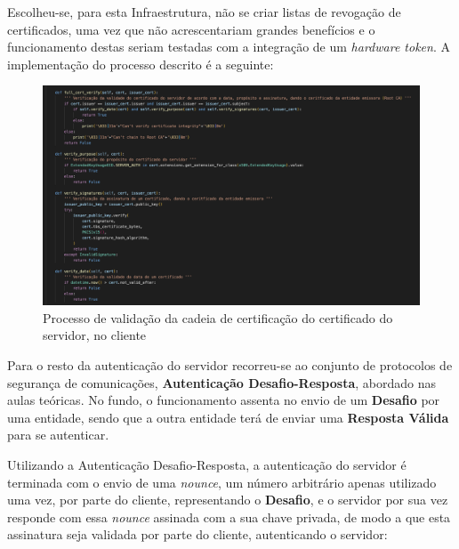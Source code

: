 \documentclass[10pt,english]{article}
\begin{document}
\par Escolheu-se, para esta Infraestrutura, não se criar listas de revogação de certificados, uma vez que não acrescentariam grandes benefícios e o funcionamento destas seriam testadas com a integração de um \textit{hardware token}. A implementação do processo descrito é a seguinte:

\begin{figure}[!h]
        \centering
        \includegraphics[width=\textwidth]{images/cert_validation_client.png}
        \caption{Processo de validação da cadeia de certificação do certificado do servidor, no cliente}
\end{figure}

\clearpage

\par Para o resto da autenticação do servidor recorreu-se ao conjunto de protocolos de segurança de comunicações, \textbf{Autenticação Desafio-Resposta}, abordado nas aulas teóricas. No fundo, o funcionamento assenta no envio de um \textbf{Desafio} por uma entidade, sendo que a outra entidade terá de enviar uma \textbf{Resposta Válida} para se autenticar.

\par Utilizando a Autenticação Desafio-Resposta, a autenticação do servidor é terminada com o envio de uma \textit{nounce}, um número arbitrário apenas utilizado uma vez, por parte do cliente, representando o \textbf{Desafio}, e o servidor por sua vez responde com essa \textit{nounce} assinada com a sua chave privada, de modo a que esta assinatura seja validada por parte do cliente, autenticando o servidor:
\end{document}
